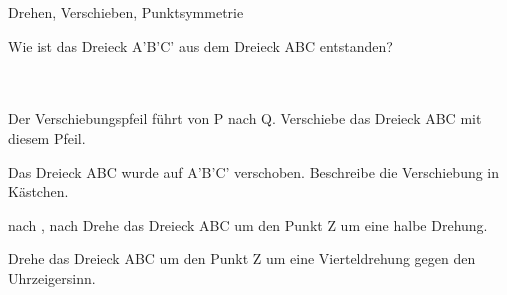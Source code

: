 \setcounter{aufgabe}{21}

\begin{aufgabe}{Drehen, Verschieben, Punktsymmetrie}
\begin{teile}
\teil Wie ist das Dreieck A'B'C' aus dem Dreieck ABC entstanden? \\  \\  \\ 

\begin{ksys}[xmin=0,xmax=8,ymin=0,ymax=5]       \end{ksys}
\teil Der Verschiebungspfeil führt von P nach Q. Verschiebe das Dreieck ABC mit diesem Pfeil.

\begin{ksys}[xmin=0,xmax=10,ymin=0,ymax=8]      \end{ksys}
\teil Das Dreieck ABC wurde auf A'B'C' verschoben. Beschreibe die Verschiebung in Kästchen.

\begin{ksys}[xmin=0,xmax=9,ymin=0,ymax=8]       \end{ksys}
\leerfeld[Kästchen] nach \leerfeld , \leerfeld[Kästchen] nach \leerfeld
\teil Drehe das Dreieck ABC um den Punkt Z um eine halbe Drehung.

\begin{ksys}[xmin=-5,xmax=8,ymin=-5,ymax=8]     \end{ksys}
\teil Drehe das Dreieck ABC um den Punkt Z um eine Vierteldrehung gegen den Uhrzeigersinn.


\end{teile}
\end{aufgabe}
